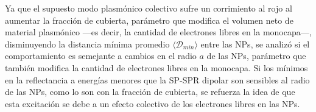 Ya que el supuesto modo plasmónico colectivo sufre un corrimiento al rojo al aumentar la fracción de cubierta, parámetro que modifica el volumen neto de material plasmónico ---es decir, la cantidad de electrones libres en la monocapa---, disminuyendo la distancia mínima promedio $\langle\mathscr{D}_{min}\rangle$ entre las NPs, se analizó si el comportamiento es semejante a cambios en el radio $a$ de las NPs, parámetro que también modifica la cantidad de electrones libres en la monocapa. Si  los mínimos en la reflectancia  a energías menores que la SP-SPR dipolar son sensibles al radio de las NPs, como lo son con la fracción de cubierta, se refuerza la idea de que esta excitación se debe a un efecto colectivo de los electrones libres en las NPs.
 
\begin{figure}[h!]\centering
\hspace*{-.5em}
\end{figure}
